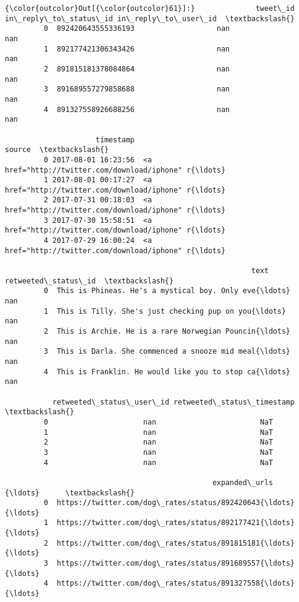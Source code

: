 \documentclass[11pt]{article}
\begin{document}
\begin{Verbatim}[commandchars=\\\{\}]
{\color{outcolor}Out[{\color{outcolor}61}]:}              tweet\_id in\_reply\_to\_status\_id in\_reply\_to\_user\_id  \textbackslash{}
         0  892420643555336193                   nan                 nan   
         1  892177421306343426                   nan                 nan   
         2  891815181378084864                   nan                 nan   
         3  891689557279858688                   nan                 nan   
         4  891327558926688256                   nan                 nan   
         
                     timestamp                                             source  \textbackslash{}
         0 2017-08-01 16:23:56  <a href="http://twitter.com/download/iphone" r{\ldots}   
         1 2017-08-01 00:17:27  <a href="http://twitter.com/download/iphone" r{\ldots}   
         2 2017-07-31 00:18:03  <a href="http://twitter.com/download/iphone" r{\ldots}   
         3 2017-07-30 15:58:51  <a href="http://twitter.com/download/iphone" r{\ldots}   
         4 2017-07-29 16:00:24  <a href="http://twitter.com/download/iphone" r{\ldots}   
         
                                                         text retweeted\_status\_id  \textbackslash{}
         0  This is Phineas. He's a mystical boy. Only eve{\ldots}                 nan   
         1  This is Tilly. She's just checking pup on you{\ldots}                 nan   
         2  This is Archie. He is a rare Norwegian Pouncin{\ldots}                 nan   
         3  This is Darla. She commenced a snooze mid meal{\ldots}                 nan   
         4  This is Franklin. He would like you to stop ca{\ldots}                 nan   
         
           retweeted\_status\_user\_id retweeted\_status\_timestamp  \textbackslash{}
         0                      nan                        NaT   
         1                      nan                        NaT   
         2                      nan                        NaT   
         3                      nan                        NaT   
         4                      nan                        NaT   
         
                                                expanded\_urls     {\ldots}      \textbackslash{}
         0  https://twitter.com/dog\_rates/status/892420643{\ldots}     {\ldots}       
         1  https://twitter.com/dog\_rates/status/892177421{\ldots}     {\ldots}       
         2  https://twitter.com/dog\_rates/status/891815181{\ldots}     {\ldots}       
         3  https://twitter.com/dog\_rates/status/891689557{\ldots}     {\ldots}       
         4  https://twitter.com/dog\_rates/status/891327558{\ldots}     {\ldots}       
         

\end{Verbatim}
\end{document}

